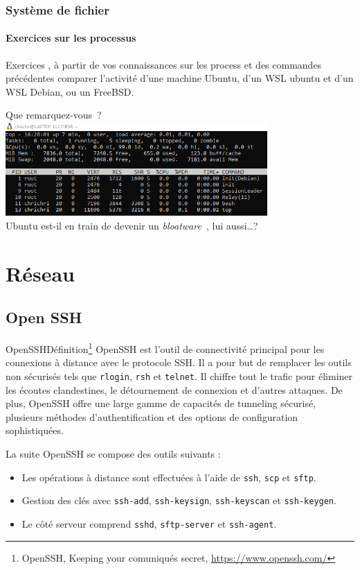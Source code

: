 \documentclass{beamer}
\begin{document}
    \begin{frame}
        \transdissolve
        \frametitle{Système de fichier}
        \framesubtitle{Exercices sur les processus}
        Exercices \execcounterdispinc{}, à partir de vos connaissances sur les process et des commandes précédentes comparer l'activité d'une machine Ubuntu, d'un WSL ubuntu et d'un WSL Debian, ou un FreeBSD.

        Que remarquez-vous~?
        \pause
        \bigbreak
        \centering
        \includegraphics[width=10cm]{image/top-debian} \\ Ubuntu est-il en train de devenir un \textit{bloatware~}, lui aussi\ldots {}?
    \end{frame}


    \section{Réseau}\label{sec:network}

    \subsection{Open SSH}\label{subsec:openssh}

    \begin{frame}{OpenSSH}{Définition\footnote{\label{openssh-site}OpenSSH, Keeping your comuniqués secret, \url{https://www.openssh.com/}}}
        \transdissolve
        OpenSSH est l'outil de connectivité principal pour les connexions à distance avec le protocole SSH.
        Il a pour but de remplacer les outils non sécurisés tels que \texttt{rlogin}, \texttt{rsh} et \texttt{telnet}.
        Il chiffre tout le trafic pour éliminer les écoutes clandestines, le détournement de connexion et d'autres attaques.
        De plus, OpenSSH offre une large gamme de capacités de tunneling sécurisé, plusieurs méthodes d'authentification et des options de configuration sophistiquées.

        La suite OpenSSH se compose des outils suivants :
        \begin{itemize}
            \item Les opérations à distance sont effectuées à l'aide de \texttt{ssh}, \texttt{scp} et \texttt{sftp}.
            \item Gestion des clés avec \texttt{ssh-add}, \texttt{ssh-keysign}, \texttt{ssh-keyscan} et \texttt{ssh-keygen}.
            \item Le côté serveur comprend \texttt{sshd}, \texttt{sftp-server} et \texttt{ssh-agent}.
        \end{itemize}
    \end{frame}
\end{document}
